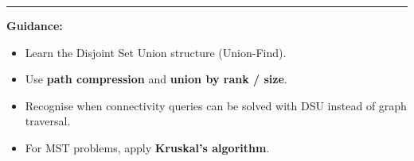 \documentclass[11pt]{article}
\begin{document}
\vspace{1em}

\hrule
\vspace{1em}

\noindent
\textbf{Guidance:}

\begin{itemize}
\item Learn the Disjoint Set Union structure (Union-Find).
\item Use \textbf{path compression} and \textbf{union by rank / size}.
\item Recognise when connectivity queries can be solved with DSU instead of graph traversal.
\item For MST problems, apply \textbf{Kruskal's algorithm}.
\end{itemize}
\end{document}
